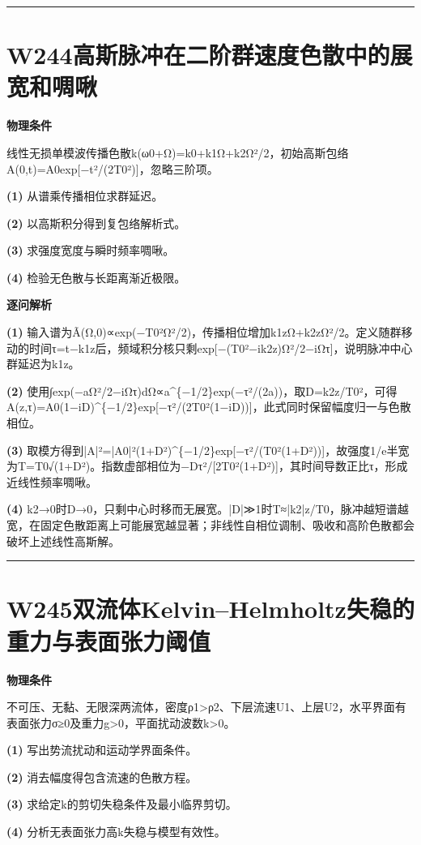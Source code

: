 \documentclass[UTF8,a4paper,11pt,oneside,openany]{ctexbook}
\begin{document}
\par\bigskip\hrule\bigskip
\section*{W244\quad 高斯脉冲在二阶群速度色散中的展宽和啁啾}
\textbf{物理条件}\par 线性无损单模波传播色散k(ω0+Ω)=k0+k1Ω+k2Ω²/2，初始高斯包络A(0,t)=A0exp[−t²/(2T0²)]，忽略三阶项。
\par\noindent\textbf{(1)} 从谱乘传播相位求群延迟。
\par\noindent\textbf{(2)} 以高斯积分得到复包络解析式。
\par\noindent\textbf{(3)} 求强度宽度与瞬时频率啁啾。
\par\noindent\textbf{(4)} 检验无色散与长距离渐近极限。

\par\medskip\noindent\textbf{逐问解析}
\par\noindent\textbf{(1)} 输入谱为Ã(Ω,0)∝exp(−T0²Ω²/2)，传播相位增加k1zΩ+k2zΩ²/2。定义随群移动的时间τ=t−k1z后，频域积分核只剩exp[−(T0²−ik2z)Ω²/2−iΩτ]，说明脉冲中心群延迟为k1z。
\par\noindent\textbf{(2)} 使用∫exp(−aΩ²/2−iΩτ)dΩ∝a\textasciicircum{}\{−1/2\}exp(−τ²/(2a))，取D=k2z/T0²，可得A(z,τ)=A0(1−iD)\textasciicircum{}\{−1/2\}exp[−τ²/(2T0²(1−iD))]，此式同时保留幅度归一与色散相位。
\par\noindent\textbf{(3)} 取模方得到|A|²=|A0|²(1+D²)\textasciicircum{}\{−1/2\}exp[−τ²/(T0²(1+D²))]，故强度1/e半宽为T=T0√(1+D²)。指数虚部相位为−Dτ²/[2T0²(1+D²)]，其时间导数正比τ，形成近线性频率啁啾。
\par\noindent\textbf{(4)} k2→0时D→0，只剩中心时移而无展宽。|D|≫1时T≈|k2|z/T0，脉冲越短谱越宽，在固定色散距离上可能展宽越显著；非线性自相位调制、吸收和高阶色散都会破坏上述线性高斯解。

\par\bigskip\hrule\bigskip
\section*{W245\quad 双流体Kelvin–Helmholtz失稳的重力与表面张力阈值}
\textbf{物理条件}\par 不可压、无黏、无限深两流体，密度ρ1>ρ2、下层流速U1、上层U2，水平界面有表面张力σ≥0及重力g>0，平面扰动波数k>0。
\par\noindent\textbf{(1)} 写出势流扰动和运动学界面条件。
\par\noindent\textbf{(2)} 消去幅度得包含流速的色散方程。
\par\noindent\textbf{(3)} 求给定k的剪切失稳条件及最小临界剪切。
\par\noindent\textbf{(4)} 分析无表面张力高k失稳与模型有效性。
\end{document}
